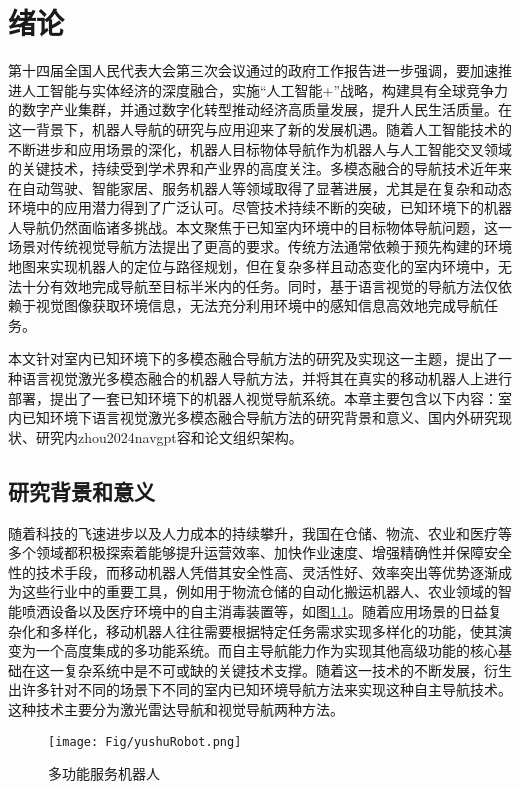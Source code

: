 \chapter{绪论}
%
	第十四届全国人民代表大会第三次会议通过的政府工作报告进一步强调，要加速推进人工智能与实体经济的深度融合，实施“人工智能+”战略，构建具有全球竞争力的数字产业集群，并通过数字化转型推动经济高质量发展，提升人民生活质量\cite{China2025}。在这一背景下，机器人导航的研究与应用迎来了新的发展机遇。随着人工智能技术的不断进步和应用场景的深化，机器人目标物体导航\cite{zhang2022survey}作为机器人与人工智能交叉领域的关键技术，持续受到学术界和产业界的高度关注。多模态融合的导航技术近年来在自动驾驶、智能家居、服务机器人等领域取得了显著进展\cite{majumdar2022zson}，尤其是在复杂和动态环境中的应用潜力得到了广泛认可。尽管技术持续不断的突破，已知环境下的机器人导航仍然面临诸多挑战。本文聚焦于已知室内环境中的目标物体导航问题\cite{sun2024survey}，这一场景对传统视觉导航方法提出了更高的要求。传统方法通常依赖于预先构建的环境地图来实现机器人的定位与路径规划，但在复杂多样且动态变化的室内环境中，无法十分有效地完成导航至目标半米内的任务\cite{mavrogiannis2023core}。同时，基于语言视觉的导航方法仅依赖于视觉图像获取环境信息，无法充分利用环境中的感知信息高效地完成导航任务\cite{li2023reinforcement}。

	本文针对室内已知环境下的多模态融合导航方法的研究及实现这一主题，提出了一种语言视觉激光多模态融合的机器人导航方法，并将其在真实的移动机器人上进行部署，提出了一套已知环境下的机器人视觉导航系统。本章主要包含以下内容：室内已知环境下语言视觉激光多模态融合导航方法的研究背景和意义、国内外研究现状、研究内zhou2024navgpt容和论文组织架构。

\section{研究背景和意义}
	随着科技的飞速进步以及人力成本的持续攀升，我国在仓储、物流、农业和医疗等多个领域都积极探索着能够提升运营效率、加快作业速度、增强精确性并保障安全性的技术手段，而移动机器人凭借其安全性高、灵活性好、效率突出等优势逐渐成为这些行业中的重要工具\cite{reddy2023advancements}，例如用于物流仓储的自动化搬运机器人、农业领域的智能喷洒设备以及医疗环境中的自主消毒装置等，如图\ref{serverrobot}。随着应用场景的日益复杂化和多样化，移动机器人往往需要根据特定任务需求实现多样化的功能，使其演变为一个高度集成的多功能系统。而自主导航能力作为实现其他高级功能的核心基础在这一复杂系统中是不可或缺的关键技术支撑。随着这一技术的不断发展，衍生出许多针对不同的场景下不同的室内已知环境导航方法来实现这种自主导航技术。这种技术主要分为激光雷达导航\cite{zhang2014loam}和视觉导航\cite{kazerouni2022survey}两种方法。
	\begin{figure}[htbp]
		\centering
		\texttt{[image: Fig/yushuRobot.png]}
		\caption{\label{serverrobot}多功能服务机器人}
	\end{figure}

